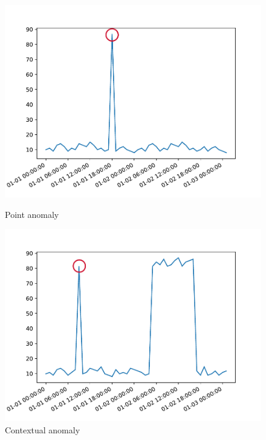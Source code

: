 \begin{figure}[H]
	\begin{minipage}{.475\textwidth}
		\includegraphics[width=\textwidth, clip, trim=0cm 0.5cm 1cm 1cm]{Resources/Images/Anomalies/point_anomaly.pdf}
		\caption{Point anomaly}
		\label{fig:images:point_anomaly}
	\end{minipage}
	\hspace{0.05\textwidth}
	\begin{minipage}{.475\textwidth}
		\includegraphics[width=\textwidth, clip, trim=0cm 0.5cm 1cm 1cm]{Resources/Images/Anomalies/contextual_anomaly.pdf}
		\caption{Contextual anomaly}
		\label{fig:images:contextual_anomaly}
	\end{minipage}
\end{figure}


